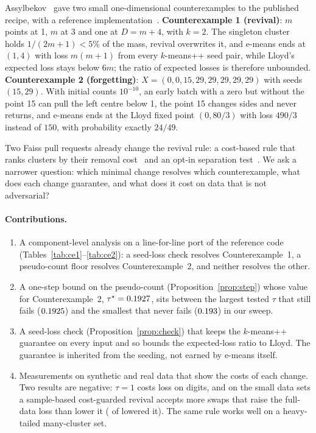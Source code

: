 \documentclass[11pt]{article}
\theoremstyle{remark}
\begin{document}
Assylbekov~\cite{assylbekov2026} gave two small one-dimensional counterexamples to the published
recipe, with a reference implementation~\cite{zh3nisrepo}.
\textbf{Counterexample 1 (revival)}: $m$ points at 1, $m$ at 3 and one at $D=m+4$, with $k=2$.
The singleton cluster holds $1/(2m+1)<5\%$ of the mass, revival overwrites it, and e-means ends at
$(1,4)$ with loss $m(m+1)$ from every $k$-means++ seed pair, while Lloyd's expected loss stays below
$6m$; the ratio of expected losses is therefore unbounded.
\textbf{Counterexample 2 (forgetting)}: $X=(0,0,15,29,29,29,29,29)$ with seeds $(15,29)$. With
initial counts $10^{-10}$, an early batch with a zero but without the point 15 can pull the left centre below 1, the point 15 changes sides and never returns, and e-means ends at the Lloyd
fixed point $(0,80/3)$ with loss $490/3$ instead of $150$, with probability exactly $24/49$.

Two Faiss pull requests already change the revival rule: a cost-based rule that ranks clusters by
their removal cost~\cite{pr5915} and an opt-in separation test~\cite{pr5908}. We ask a narrower
question: which minimal change resolves which counterexample, what does each change guarantee,
and what does it cost on data that is not adversarial?

\paragraph{Contributions.}
\begin{enumerate}
\item A component-level analysis on a line-for-line port of the reference code
  (Tables~\ref{tab:ce1}--\ref{tab:ce2}): a seed-loss check resolves Counterexample~1, a
  pseudo-count floor resolves Counterexample~2, and neither resolves the other.
\item A one-step bound on the pseudo-count (Proposition~\ref{prop:step}) whose value for
  Counterexample~2, $\tau^\star=0.1927$, sits between the largest tested $\tau$ that still fails
  ($0.1925$) and the smallest that never fails ($0.193$) in our sweep.
\item A seed-loss check (Proposition~\ref{prop:check}) that keeps the $k$-means++ guarantee on every
  input and so bounds the expected-loss ratio to Lloyd. The guarantee is inherited from the
  seeding, not earned by e-means itself.
\item Measurements on synthetic and real data that show the costs of each change. Two results are
  negative: $\tau=1$ costs loss on digits, and on the small data sets a sample-based cost-guarded
  revival accepts more swaps that raise the full-data loss than lower it
  (\swapsSmallDown{} of \swapsSmallTotal{} lowered it). The same rule works well on a heavy-tailed
  many-cluster set.
\end{enumerate}

\end{document}
